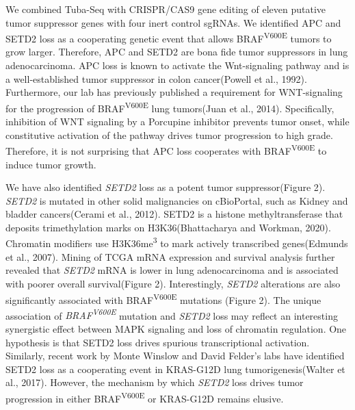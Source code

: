 We combined Tuba-Seq with CRISPR/CAS9 gene editing of eleven putative tumor suppressor genes with four inert control sgRNAs. We identified APC and SETD2 loss as a cooperating genetic event that allows BRAF\textsuperscript{V600E} tumors to grow larger.
Therefore, APC and SETD2 are bona fide tumor suppressors in lung adenocarcinoma.
APC loss is known to activate the Wnt-signaling pathway and is a well-established tumor suppressor in colon cancer(Powell et al., 1992).
Furthermore, our lab has previously published a requirement for WNT-signaling for the progression of BRAF\textsuperscript{V600E} lung tumors(Juan et al., 2014).
Specifically, inhibition of WNT signaling by a Porcupine inhibitor prevents tumor onset, while constitutive activation of the pathway drives tumor progression to high grade.
Therefore, it is not surprising that APC loss cooperates with BRAF\textsuperscript{V600E} to induce tumor growth.

We have also identified \emph{SETD2} loss as a potent tumor suppressor(Figure 2).
\emph{SETD2} is mutated in other solid malignancies on cBioPortal, such as Kidney and bladder cancers(Cerami et al., 2012).
SETD2 is a histone methyltransferase that deposits trimethylation marks on H3K36(Bhattacharya and Workman, 2020).
Chromatin modifiers use H3K36me\textsuperscript{3} to mark actively transcribed genes(Edmunds et al., 2007).
Mining of TCGA mRNA expression and survival analysis further revealed that \emph{SETD2} mRNA is lower in lung adenocarcinoma and is associated with poorer overall survival(Figure 2).
Interestingly, \emph{SETD2} alterations are also significantly associated with BRAF\textsuperscript{V600E} mutations (Figure 2).
The unique association of \emph{BRAF\textsuperscript{V600E}} mutation and \emph{SETD2} loss may reflect an interesting synergistic effect between MAPK signaling and loss of chromatin regulation.
One hypothesis is that SETD2 loss drives spurious transcriptional activation.\\
Similarly, recent work by Monte Winslow and David Felder's labs have identified SETD2 loss as a cooperating event in KRAS-G12D lung tumorigenesis(Walter et al., 2017).
However, the mechanism by which \emph{SETD2} loss drives tumor progression in either BRAF\textsuperscript{V600E} or KRAS-G12D remains elusive.

